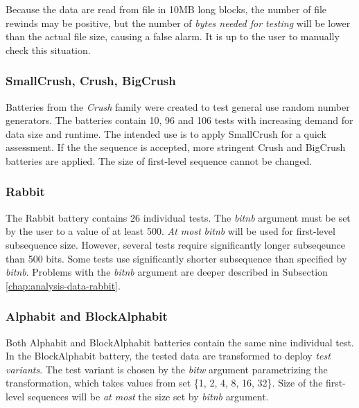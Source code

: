 \documentclass[
  digital,     %
  oneside,     %
  nosansbold,  %
  nocolorbold, %
  nolof,         %
  nolot,         %
]{fithesis4}
\begin{document}
Because the data are read from file in 10MB long blocks, the number of file rewinds may be positive, but the number of \emph{bytes needed for testing} will be lower than the actual file size, causing a false alarm. It is up to the user to manually check this situation. %


\subsubsection{SmallCrush, Crush, BigCrush}
Batteries from the \emph{Crush} family were created to test general use random number generators. The batteries contain 10, 96 and 106 tests with increasing demand for data size and runtime. The intended use is to apply SmallCrush for a quick assessment. If the the sequence is accepted, more stringent Crush and BigCrush batteries are applied. The size of first-level sequence cannot be changed. \cite[p. 242]{tu01_guide}

\subsubsection{Rabbit}
The Rabbit battery contains 26 individual tests. The \emph{bit\textunderscore nb} argument must be set by the user to a value of at least 500. \emph{At most} \emph{bit\textunderscore nb} will be used for first-level subsequence size. \cite[p. 152]{tu01_guide} However, several tests require significantly longer subseqeunce than 500 bits. Some tests use significantly shorter subsequence than specified by \emph{bit\textunderscore nb}. Problems with the \emph{bit\textunderscore nb} argument are deeper described in Subsection \ref{chap:analysis-data-rabbit}.

\subsubsection{Alphabit and BlockAlphabit}
Both Alphabit and BlockAlphabit batteries contain the same nine individual test. In the BlockAlphabit battery, the tested data are transformed to deploy \emph{test variants}. The test variant is chosen by the \emph{bit\textunderscore w} argument parametrizing the transformation, which takes values from set \{1, 2, 4, 8, 16, 32\}. \cite[p. 155]{tu01_guide} Size of the first-level sequences will be \emph{at most} the size set by \emph{bit\textunderscore nb} argument.


\end{document}
